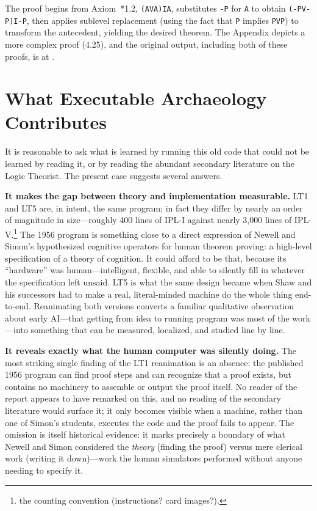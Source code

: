 \documentclass[journal]{IEEEtran}
\begin{document}
The proof begins from Axiom~*1.2, \texttt{(AVA)IA}, substitutes
\texttt{-P} for \texttt{A} to obtain \texttt{(-PV-P)I-P}, then applies
sublevel replacement (using the fact that \texttt{P} implies
\texttt{PVP}) to transform the antecedent, yielding the desired
theorem. The Appendix depicts a more complex proof (4.25), and the
original output, including both of these proofs, is at
\cite{runoutput}.


\section{What Executable Archaeology Contributes}
\label{sec:contribution}


It is reasonable to ask what is learned by running this old code that
could not be learned by reading it, or by reading the abundant
secondary literature on the Logic Theorist. The present case suggests
several answers.

\textbf{It makes the gap between theory and implementation
measurable.} LT1 and LT5 are, in intent, the same program; in fact
they differ by nearly an order of magnitude in size---roughly 400
lines of IPL-I against nearly 3,000 lines of
IPL-V.\footnote{%
the counting convention (instructions? card images?).} The 1956
program is something close to a direct expression of Newell and
Simon's hypothesized cognitive operators for human theorem proving: a
high-level specification of a theory of cognition. It could afford to
be that, because its ``hardware'' was human---intelligent, flexible,
and able to silently fill in whatever the specification left
unsaid. LT5 is what the same design became when Shaw and his
successors had to make a real, literal-minded machine do the whole
thing end-to-end. Reanimating both versions converts a familiar
qualitative observation about early AI---that getting from idea to
running program was most of the work---into something that can be
measured, localized, and studied line by line.

\textbf{It reveals exactly what the human computer was silently
doing.} The most striking single finding of the LT1 reanimation is an
absence: the published 1956 program can find proof steps and can
recognize that a proof exists, but contains no machinery to assemble
or output the proof itself. No reader of the report appears to have
remarked on this, and no reading of the secondary literature would
surface it; it only becomes visible when a machine, rather than one of
Simon's students, executes the code and the proof fails to
appear. The omission is itself historical evidence: it marks
precisely a boundary of what Newell and Simon considered the
\emph{theory} (finding the proof) versus mere clerical work
(writing it down)---work the human simulators performed without
anyone needing to specify it.
\end{document}
